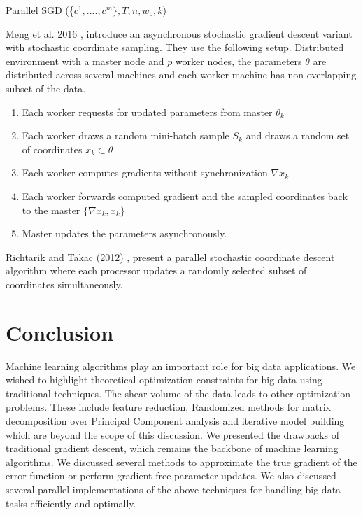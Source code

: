 \documentclass[sigconf]{acmart}
\begin{document}
\begin{algorithm}

\caption{Parallel SGD (\{$ c^1,....,c^m\} , T, n, w_o,k$)}\label{SGD}

\begin{algorithmic}[1] 
\EndFor
\EndWhile
\end{algorithmic}

\end{algorithm}

Meng et al. 2016 \cite{Meng}, introduce an asynchronous stochastic gradient descent variant with stochastic coordinate sampling. They use the following setup. Distributed environment with a master node and $p$ worker nodes, the parameters $\theta$ are distributed across several machines and each worker machine has non-overlapping subset of the data.

\begin{enumerate}
\item Each worker requests for updated parameters from master $\theta_k$
\item Each worker draws a random mini-batch sample $S_k$ and draws a random set of coordinates $x_k \subset \theta$
\item Each worker computes gradients without synchronization $\nabla x_k$
\item Each worker forwards computed gradient and the sampled coordinates back to the master $\{\nabla x_k , x_k \}$
\item Master updates the parameters asynchronously.
\end{enumerate}


Richtarik and Takac (2012) \cite{2012arXiv}, present a parallel stochastic coordinate descent algorithm where each processor updates a randomly selected subset of coordinates simultaneously. 

\section{Conclusion} \label{conclude}

Machine learning algorithms play an important role for big data applications. We wished to highlight theoretical optimization constraints for big data using traditional techniques. The shear volume of the data leads to other optimization problems. These include feature reduction, Randomized methods for matrix decomposition over Principal Component analysis and iterative model building which are beyond the scope of this discussion. We presented the drawbacks of traditional gradient descent, which remains the backbone of machine learning algorithms. We discussed several methods to approximate the true gradient of the error function or perform gradient-free parameter updates. We also discussed several parallel implementations of the above techniques for handling big data tasks efficiently and optimally. 



 

\appendix


\end{document}
